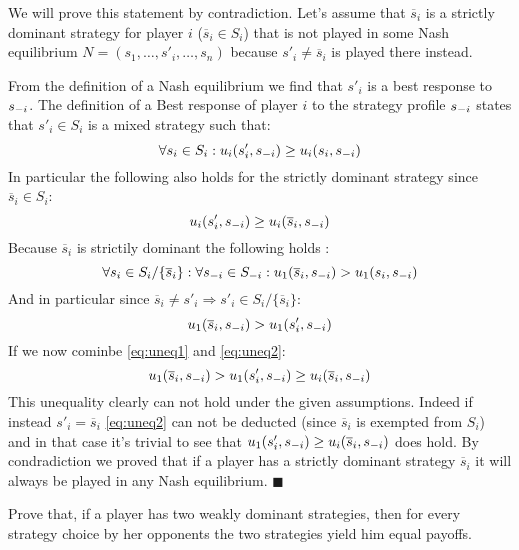 \documentclass[../main.tex]{subfiles}
\begin{document}
\begin{solution}
	We will prove this statement by contradiction.
	Let's assume that $\overline{s}_i$ is a strictly dominant strategy for player $i$ ($\overline{s}_i \in S_i$) that is not played in some Nash equilibrium $N = (s_1,\ldots,s'_i,\ldots,s_n)$ because $s'_i \neq \overline{s}_i$ is played there instead.

	From the definition of a Nash equilibrium  we find that $s'_i$ is a best response to $s_{\--i}$.
	The definition of a Best response of player $i$ to the strategy profile $s_{\--i}$ states that $s'_i \in S_i$ is a mixed strategy such that:
	\begin{equation}
		\label{eq:bestr}
		\forall s_i \in S_i : u_i(s'_i,s_{\--i}) \geq u_i(s_i,s_{\--i})
	\end{equation}
	In particular the following also holds for the strictly dominant strategy since $\overline{s}_i \in S_i$:
	\begin{equation}
		\label{eq:uneq1}
		u_i(s'_i,s_{\--i}) \geq u_i(\overline{s}_i,s_{\--i})
	\end{equation}
	Because $\overline{s}_i$ is strictily dominant the following holds :
	\begin{equation}
		\forall s_i \in S_i/\{\overline{s}_i\}: \forall s_{\--i} \in S_{\--i} : u_1(\overline{s}_i,s_{\--i}) > u_1(s_i,s_{\--i})
	\end{equation}
	And in particular since $\overline{s}_i \neq s'_i \Rightarrow s'_i \in S_i/\{\overline{s}_i\}$:
	\begin{equation}
		\label{eq:uneq2}
		 u_1(\overline{s}_i,s_{\--i}) > u_1(s'_i,s_{\--i})
	\end{equation}
	If we now cominbe \autoref{eq:uneq1} and \autoref{eq:uneq2}:
	\begin{equation}
		 u_1(\overline{s}_i,s_{\--i}) > u_1(s'_i,s_{\--i}) \geq u_i(\overline{s}_i,s_{\--i})
	\end{equation}
	This unequality clearly can not hold under the given assumptions.
	Indeed if instead $s'_i = \overline{s}_i$ \autoref{eq:uneq2} can not be deducted (since $\overline{s}_i$ is exempted from $S_i$) and in that case it's trivial to see that $u_1(s'_i,s_{\--i}) \geq u_i(\overline{s}_i,s_{\--i})$ does hold.
	By condradiction we proved that if a player has a strictly dominant strategy $\overline{s}_i$ it will always be played in any Nash equilibrium. $\blacksquare$ 
\end{solution}

\begin{question}
	Prove that, if a player has two weakly dominant strategies, then for every strategy choice by her opponents the two strategies yield him equal payoffs.
\end{question}
\end{document}
